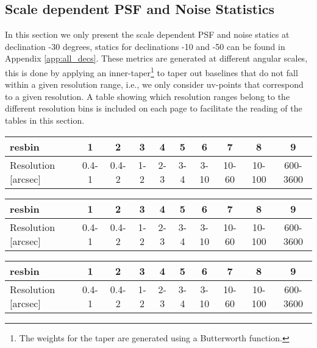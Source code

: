 \documentclass[sfheadings,a4paper,times,9pt,floats,floatfix]{article}
\begin{document}
\begin{landscape}
\subsection{Scale dependent PSF and Noise Statistics}
In this section we only present the scale dependent PSF and noise statics at declination -30 degrees, statics for
declinations -10 and -50 can be found in Appendix \ref{app:all_decs}. These metrics are generated at different angular
scales, this is done by applying an inner-taper\footnote{The weights for the taper are generated using a Butterworth
function.} to taper out baselines that do not fall within a given resolution range, i.e., we only consider uv-points
that correspond to a given resolution. A table showing which resolution ranges belong to the different resolution bins
is included on each page to facilitate the reading of the tables in this section.
 \begin{table}[H]
  \begin{tabular}{|lccccccccc|}\hline
  resbin & 1 & 2 & 3 & 4 & 5 & 6 & 7 & 8 & 9 \\\hline
  Resolution [arcsec] & 0.4-1 & 0.4-2 & 1-2 & 2-3 & 3-4 & 3-10 & 10-60 & 10-100 & 600-3600 \\\hline
  \end{tabular}
 \end{table}

 
 
 
\end{landscape}
\begin{landscape}
 \begin{table}[H]
  \begin{tabular}{|lccccccccc|}\hline
  resbin & 1 & 2 & 3 & 4 & 5 & 6 & 7 & 8 & 9 \\\hline
  Resolution [arcsec] & 0.4-1 & 0.4-2 & 1-2 & 2-3 & 3-4 & 3-10 & 10-60 & 10-100 & 600-3600 \\\hline
  \end{tabular}
 \end{table}
 
 
 
\end{landscape}
 \begin{table}[H]
  \begin{tabular}{|lccccccccc|}\hline
  resbin & 1 & 2 & 3 & 4 & 5 & 6 & 7 & 8 & 9 \\\hline
  Resolution [arcsec] & 0.4-1 & 0.4-2 & 1-2 & 2-3 & 3-4 & 3-10 & 10-60 & 10-100 & 600-3600 \\\hline
  \end{tabular}
 \end{table}
\end{document}
